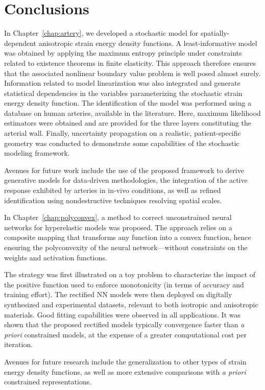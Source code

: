 \chapter{Conclusions}

In Chapter~\ref{chap:artery}, we developed a stochastic model for spatially-dependent anisotropic strain energy density functions. A least-informative model was obtained by applying the maximum entropy principle under constraints related to existence theorems in finite elasticity. This approach therefore ensures that the associated nonlinear boundary value problem is well posed almost surely. Information related to model linearization was also integrated and generate statistical dependencies in the variables parameterizing the stochastic strain energy density function. The identification of the model was performed using a database on human arteries, available in the literature. Here, maximum likelihood estimators were obtained and are provided for the three layers constituting the arterial wall. Finally, uncertainty propagation on a realistic, patient-specific geometry was conducted to demonstrate some capabilities of the stochastic modeling framework.

Avenues for future work include the use of the proposed framework to derive generative models for data-driven methodologies, the integration of the active response exhibited by arteries in in-vivo conditions, as well as refined identification using nondestructive techniques resolving spatial scales.

In Chapter~\ref{chap:polyconvex}, a method to correct unconstrained neural networks for hyperelastic models was proposed. The approach relies on a composite mapping that transforms any function into a convex function, hence ensuring the polyconvexity of the neural network---without constraints on the weights and  activation functions. 

The strategy was first illustrated on a toy problem to characterize the impact of the positive function used to enforce monotonicity (in terms of accuracy and training effort). The rectified NN models were then deployed on digitally synthesized and experimental datasets, relevant to both isotropic and anisotropic materials. Good fitting capabilities were observed in all applications. It was shown that the proposed rectified models typically convergence faster than \textit{a priori} constrained models, at the expense of a greater computational cost per iteration. 

Avenues for future research include the generalization to other types of strain energy density functions, as well as more extensive comparisons with \textit{a priori} constrained representations. 